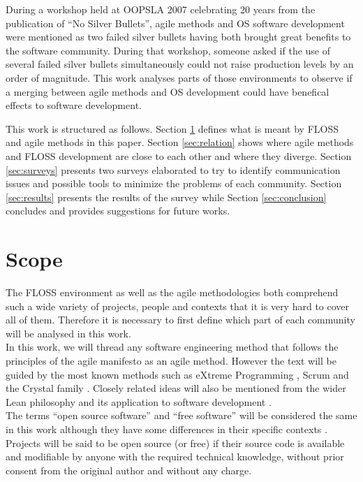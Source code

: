\documentclass[lnbip]{svmultln}
\begin{document}
During a workshop \cite{conference:oopsla2007} held at OOPSLA 2007
celebrating 20 years from the publication of ``No Silver
Bullets''\cite{brooks1987}, agile methods and OS software development
were mentioned as two failed silver bullets having both brought great
benefits to the software community. During that workshop, someone
asked if the use of several failed silver bullets simultaneously could
not raise production levels by an order of magnitude. This work
analyses parts of those environments to observe if a merging between
agile methods and OS development could have benefical effects to
software development.

This work is structured as follows. Section \ref{sec:scope} defines
what is meant by FLOSS and agile methods in this paper. Section
\ref{sec:relation} shows where agile methods and FLOSS development are
close to each other and where they diverge. Section \ref{sec:surveys}
presents two surveys elaborated to try to identify communication
issues and possible tools to minimize the problems of each
community. Section \ref{sec:results} presents the results of the
survey while Section \ref{sec:conclusion} concludes and provides
suggestions for future works.

\section{Scope}
\label{sec:scope}

The FLOSS environment as well as the agile methodologies both
comprehend such a wide variety of projects, people and contexts that
it is very hard to cover all of them. Therefore it is necessary to
first define which part of each community will be analysed in this
work.
\\

In this work, we will thread any software engineering method that
follows the principles of the agile manifesto
\cite{url:agilemanifesto} as an agile method. However the text will be
guided by the most known methods such as eXtreme Programming
\cite{XP2002}, Scrum \cite{schwaber2004} and the Crystal family
\cite{cockburn2002}. Closely related ideas will also be mentioned from
the wider Lean philosophy \cite{ohno1998} and its application to
software development \cite{poppendieck2005}.
\\

The terms ``open source software'' and ``free software'' will be
considered the same in this work although they have some differences
in their specific contexts \cite{fogel2005}. Projects will be said to
be open source (or free) if their source code is available and
modifiable by anyone with the required technical knowledge, without
prior consent from the original author and without any charge.
\end{document}
